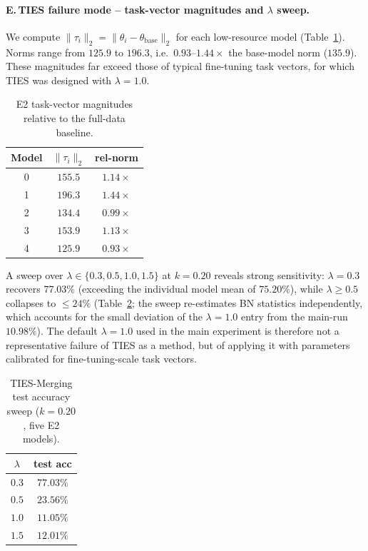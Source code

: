 \documentclass{article}
\begin{document}
\paragraph{E.\,TIES failure mode -- task-vector magnitudes and $\lambda$ sweep.}
We compute $\|\tau_i\|_2\!=\!\|\theta_i\!-\!\theta_{\text{base}}\|_2$ for each low-resource model (Table~\ref{tab:taunorms}). Norms range from $125.9$ to $196.3$, i.e.\ $0.93$--$1.44\times$ the base-model norm ($135.9$). These magnitudes far exceed those of typical fine-tuning task vectors, for which TIES was designed with $\lambda\!=\!1.0$.

\begin{table}[h]
\caption{E2 task-vector magnitudes relative to the full-data baseline.}
\label{tab:taunorms}
\begin{center}
\begin{small}
\begin{tabular}{ccc}
\toprule
Model & $\|\tau_i\|_2$ & rel-norm \\
\midrule
0 & $155.5$ & $1.14\times$ \\
1 & $196.3$ & $1.44\times$ \\
2 & $134.4$ & $0.99\times$ \\
3 & $153.9$ & $1.13\times$ \\
4 & $125.9$ & $0.93\times$ \\
\bottomrule
\end{tabular}
\end{small}
\end{center}
\end{table}

A sweep over $\lambda\!\in\!\{0.3,0.5,1.0,1.5\}$ at $k\!=\!0.20$ reveals strong sensitivity: $\lambda\!=\!0.3$ recovers $77.03\%$ (exceeding the individual model mean of $75.20\%$), while $\lambda\!\geq\!0.5$ collapses to $\leq\!24\%$ (Table~\ref{tab:tiessweep}; the sweep re-estimates BN statistics independently, which accounts for the small deviation of the $\lambda\!=\!1.0$ entry from the main-run $10.98\%$). The default $\lambda\!=\!1.0$ used in the main experiment is therefore not a representative failure of TIES as a method, but of applying it with parameters calibrated for fine-tuning-scale task vectors.

\begin{table}[h]
\caption{TIES-Merging test accuracy sweep ($k\!=\!0.20$, five E2 models).}
\label{tab:tiessweep}
\begin{center}
\begin{small}
\begin{tabular}{cc}
\toprule
$\lambda$ & test acc \\
\midrule
$0.3$ & $\mathbf{77.03\%}$ \\
$0.5$ & $23.56\%$ \\
$1.0$ & $11.05\%$ \\
$1.5$ & $12.01\%$ \\
\bottomrule
\end{tabular}
\end{small}
\end{center}
\end{table}
\end{document}
